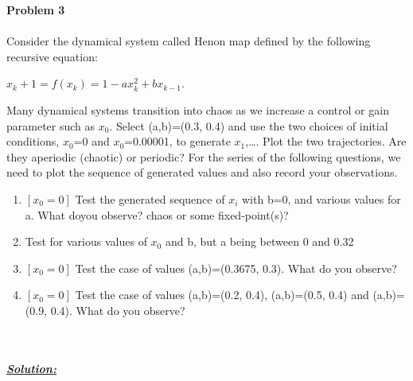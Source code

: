\documentclass{article}
\begin{document}
\newpage
\noindent \textbf{Problem 3}
\\ \\
Consider the dynamical system called Henon map defined by the following recursive equation:
\begin{center}
  ${x_k+1 = f(x_k) = 1-ax_k^2+bx_{k-1}}$.
\end{center}
Many dynamical systems transition into chaos as we increase a control or gain parameter
such as ${x_0}$. Select (a,b)=(0.3, 0.4) and use the two choices of initial conditions, $x_0$=0 and
$x_0$=0.00001, to generate $x_1$,…. Plot the two trajectories. Are they aperiodic (chaotic) or
periodic? For the series of the following questions, we need to plot the sequence of
generated values and also record your observations.
\begin{enumerate} [label=\Alph*]
  \item $[x_0=0]$ Test the generated sequence of $x_i$ with b=0, and various values for a. 
              What doyou observe? chaos or some fixed-point(s)?
  \item Test for various values of $x_0$ and b, but a being between 0 and 0.32
  \item $[x_0=0]$ Test the case of values (a,b)=(0.3675, 0.3). What do you observe?
  \item $[x_0=0]$  Test the case of values (a,b)=(0.2, 0.4), (a,b)=(0.5, 0.4) and (a,b)=(0.9, 0.4). What do you observe?
\end{enumerate}
\noindent \\ \\ 
\underline{\textbf{\textit{Solution:}}}
\end{document}
